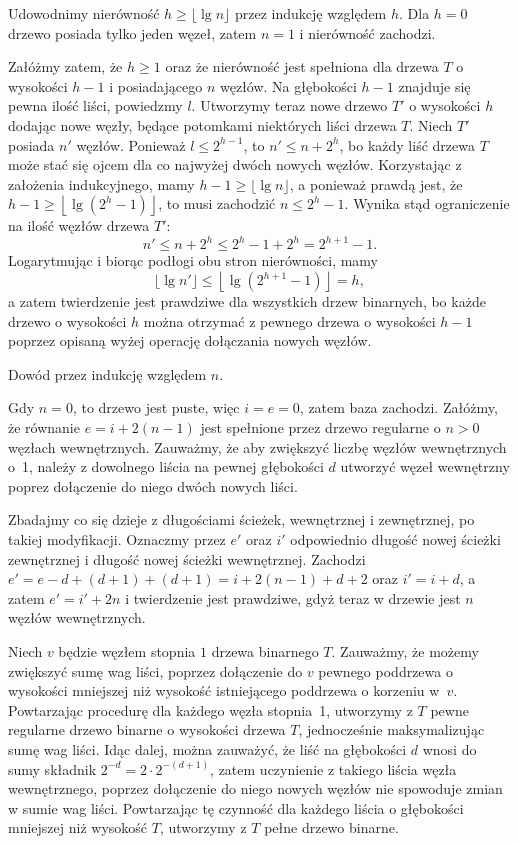 \exercise %
Udowodnimy nierówność $h\ge\lfloor\lg n\rfloor$ przez indukcję względem $h$. Dla $h=0$ drzewo posiada tylko jeden węzeł, zatem $n=1$ i nierówność zachodzi.

Załóżmy zatem, że $h\ge1$ oraz że nierówność jest spełniona dla drzewa $T$ o wysokości $h-1$ i posiadającego $n$ węzłów. Na głębokości $h-1$ znajduje się pewna ilość liści, powiedzmy $l$. Utworzymy teraz nowe drzewo $T'$ o wysokości $h$ dodając nowe węzły, będące potomkami niektórych liści drzewa $T$. Niech $T'$ posiada $n'$ węzłów. Ponieważ $l\le2^{h-1}$, to $n'\le n+2^h$, bo każdy liść drzewa $T$ może stać się ojcem dla co najwyżej dwóch nowych węzłów. Korzystając z założenia indukcyjnego, mamy $h-1\ge\lfloor\lg n\rfloor$, a ponieważ prawdą jest, że $h-1\ge\left\lfloor\lg(2^h-1)\right\rfloor$, to musi zachodzić $n\le 2^h-1$. Wynika stąd ograniczenie na ilość węzłów drzewa $T'$:
\[
	n' \le n+2^h \le 2^h-1+2^h = 2^{h+1}-1.
\]
Logarytmując i biorąc podłogi obu stron nierówności, mamy
\[
	\lfloor\lg n'\rfloor \le \left\lfloor\lg(2^{h+1}-1)\right\rfloor = h,
\]
a zatem twierdzenie jest prawdziwe dla wszystkich drzew binarnych, bo każde drzewo o wysokości $h$ można otrzymać z pewnego drzewa o wysokości $h-1$ poprzez opisaną wyżej operację dołączania nowych węzłów.

\exercise %
Dowód przez indukcję względem $n$.

Gdy $n=0$, to drzewo jest puste, więc $i=e=0$, zatem baza zachodzi. Załóżmy, że równanie $e=i+2(n-1)$ jest spełnione przez drzewo regularne o $n>0$ węzłach wewnętrznych. Zauważmy, że aby zwiększyć liczbę węzłów wewnętrznych o~1, należy z dowolnego liścia na pewnej głębokości $d$ utworzyć węzeł wewnętrzny poprez dołączenie do niego dwóch nowych liści.

Zbadajmy co się dzieje z długościami ścieżek, wewnętrznej i zewnętrznej, po takiej modyfikacji. Oznaczmy przez $e'$ oraz $i'$ odpowiednio długość nowej ścieżki zewnętrznej i długość nowej ścieżki wewnętrznej. Zachodzi $e'=e-d+(d+1)+(d+1)=i+2(n-1)+d+2$ oraz $i'=i+d$, a zatem $e'=i'+2n$ i twierdzenie jest prawdziwe, gdyż teraz w drzewie jest $n$ węzłów wewnętrznych.

\exercise %
Niech $v$ będzie węzłem stopnia $1$ drzewa binarnego $T$. Zauważmy, że możemy zwiększyć sumę wag liści, poprzez dołączenie do $v$ pewnego poddrzewa o wysokości mniejszej niż wysokość istniejącego poddrzewa o korzeniu w~$v$. Powtarzając procedurę dla każdego węzła stopnia~1, utworzymy z $T$ pewne regularne drzewo binarne o wysokości drzewa $T$, jednocześnie maksymalizując sumę wag liści. Idąc dalej, można zauważyć, że liść na głębokości $d$ wnosi do sumy składnik $2^{-d}=2\cdot2^{-(d+1)}$, zatem uczynienie z takiego liścia węzła wewnętrznego, poprzez dołączenie do niego nowych węzłów nie spowoduje zmian w sumie wag liści. Powtarzając tę czynność dla każdego liścia o głębokości mniejszej niż wysokość $T$, utworzymy z $T$ pełne drzewo binarne.

